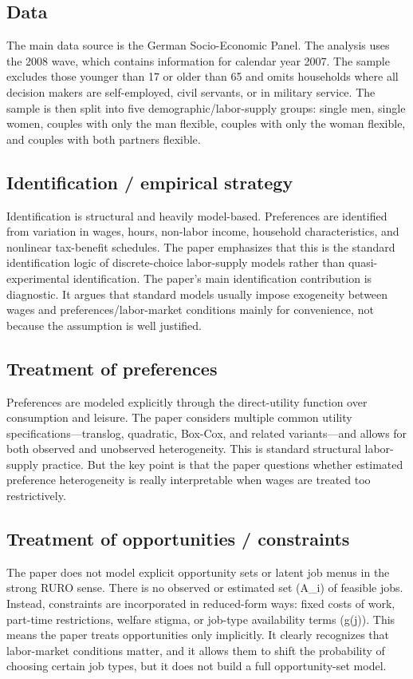 \documentclass[11pt,a4paper]{article}
\begin{document}
\subsection*{Data}
The main data source is the German Socio-Economic Panel. The analysis uses the 2008 wave, which contains information for calendar year 2007. The sample excludes those younger than 17 or older than 65 and omits households where all decision makers are self-employed, civil servants, or in military service. The sample is then split into five demographic/labor-supply groups: single men, single women, couples with only the man flexible, couples with only the woman flexible, and couples with both partners flexible.

\subsection*{Identification / empirical strategy}
Identification is structural and heavily model-based. Preferences are identified from variation in wages, hours, non-labor income, household characteristics, and nonlinear tax-benefit schedules. The paper emphasizes that this is the standard identification logic of discrete-choice labor-supply models rather than quasi-experimental identification. The paper’s main identification contribution is diagnostic. It argues that standard models usually impose exogeneity between wages and preferences/labor-market conditions mainly for convenience, not because the assumption is well justified.

\subsection*{Treatment of preferences}
Preferences are modeled explicitly through the direct-utility function over consumption and leisure. The paper considers multiple common utility specifications—translog, quadratic, Box-Cox, and related variants—and allows for both observed and unobserved heterogeneity. This is standard structural labor-supply practice. But the key point is that the paper questions whether estimated preference heterogeneity is really interpretable when wages are treated too restrictively.

\subsection*{Treatment of opportunities / constraints}
The paper does not model explicit opportunity sets or latent job menus in the strong RURO sense. There is no observed or estimated set (A\_i) of feasible jobs. Instead, constraints are incorporated in reduced-form ways: fixed costs of work, part-time restrictions, welfare stigma, or job-type availability terms (g(j)). This means the paper treats opportunities only implicitly. It clearly recognizes that labor-market conditions matter, and it allows them to shift the probability of choosing certain job types, but it does not build a full opportunity-set model.
\end{document}
